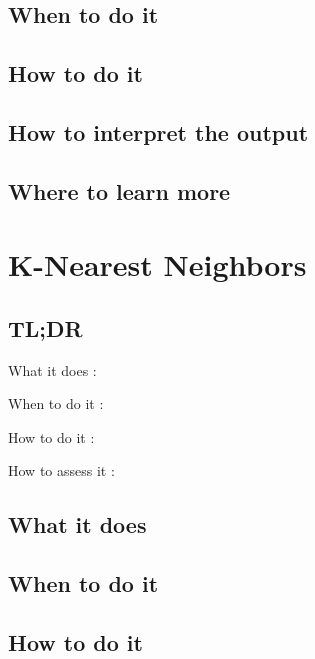 \documentclass[
]{book}
\begin{document}
\hypertarget{when-to-do-it-6}{%
\section{When to do it}\label{when-to-do-it-6}}

\hypertarget{how-to-do-it-6}{%
\section{How to do it}\label{how-to-do-it-6}}

\hypertarget{how-to-interpret-the-output-6}{%
\section{How to interpret the output}\label{how-to-interpret-the-output-6}}

\hypertarget{where-to-learn-more-6}{%
\section{Where to learn more}\label{where-to-learn-more-6}}

\hypertarget{k-nearest-neighbors}{%
\chapter{K-Nearest Neighbors}\label{k-nearest-neighbors}}

\hypertarget{tldr-7}{%
\section{TL;DR}\label{tldr-7}}

What it does
:

When to do it
:

How to do it
:

How to assess it
:

\hypertarget{what-it-does-7}{%
\section{What it does}\label{what-it-does-7}}

\hypertarget{when-to-do-it-7}{%
\section{When to do it}\label{when-to-do-it-7}}

\hypertarget{how-to-do-it-7}{%
\section{How to do it}\label{how-to-do-it-7}}
\end{document}
